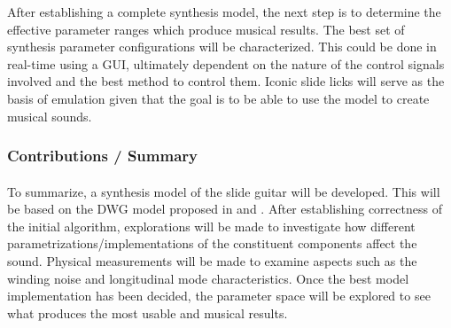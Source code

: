 \documentclass[12pt]{article}
\begin{document}
After establishing a complete synthesis model, the next step is to determine the effective parameter ranges which produce musical results. The best set of synthesis parameter configurations will be characterized. This could be done in real-time using a GUI, ultimately dependent on the nature of the control signals involved and the best method to control them. Iconic slide licks will serve as the basis of emulation given that the goal is to be able to use the model to create musical sounds.

\subsubsection*{Contributions / Summary}
\paragraph{}
To summarize, a synthesis model of the slide guitar will be developed. This will be based on the DWG model proposed in \cite{pakarinen_virtual_2008} and \cite{puputti_real-time_2012}. After establishing correctness of the initial algorithm, explorations will be made to investigate how different parametrizations/implementations of the constituent components affect the sound. Physical measurements will be made to examine aspects such as the winding noise and longitudinal mode characteristics. Once the best model implementation has been decided, the parameter space will be explored to see what produces the most usable and musical results.

\clearpage


\end{document}
